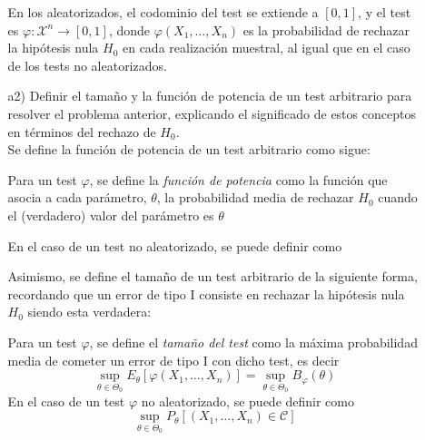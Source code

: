 \documentclass[12pt]{article}
\newcommand{\X}{\mathcal{X}}
\begin{document}
\begin{ejercicio}[2,4 puntos]
\begin{enumerate}
\begin{enumerate}
                En los aleatorizados, el codominio del test se extiende a $[0,1]$, y el test es
                $\varphi: \X^n \to [0,1]$, donde $\varphi(X_1, \ldots, X_n)$ es la probabilidad de
                rechazar la hipótesis nula $H_0$ en cada realización muestral, al igual que en el caso
                de los tests no aleatorizados.

                \newpage

                \item[a2)] Definir el tamaño y la función de potencia de un test arbitrario para resolver el
                problema anterior, explicando el significado de estos conceptos en términos del rechazo
                de $H_0$. \\

                Se define la función de potencia de un test arbitrario como sigue:

                \begin{definicion}
                    Para un test $\varphi$, se define la \textit{función de potencia} como la función 
                    que asocia a cada parámetro, $\theta$, la probabilidad media de rechazar $H_0$ cuando
                    el (verdadero) valor del parámetro es $\theta$
                \end{definicion}

                En el caso de un test no aleatorizado, se puede definir como

                Asimismo, se define el tamaño de un test arbitrario de la siguiente forma, recordando que
                un error de tipo I consiste en rechazar la hipótesis nula $H_0$ siendo esta verdadera:
                \begin{definicion}
                    Para un test $\varphi$, se define el \textit{tamaño del test} como la máxima probabilidad
                    media de cometer un error de tipo I con dicho test, es decir
                    $$\sup_{\theta \in \Theta_0} E_\theta[\varphi(X_1, \ldots, X_n)] = \sup_{\theta \in \Theta_0} B_\varphi(\theta)$$
                    En el caso de un test $\varphi$ no aleatorizado, se puede definir como 
                    $$\sup_{\theta \in \Theta_0} P_\theta[(X_1, \ldots, X_n) \in \mathcal{C}]$$
                \end{definicion} 


\end{enumerate}
\end{enumerate}
\end{ejercicio}
\end{document}
